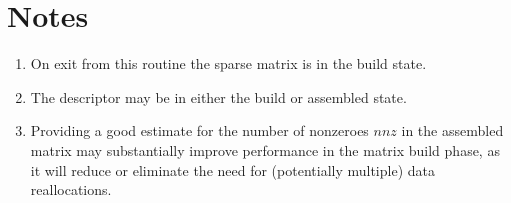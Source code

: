 \section*{Notes}
\begin{enumerate}
\item On exit from this routine the sparse matrix  is in the build
  state.
\item The descriptor may be in either the build or assembled state.
\item Providing a good estimate for the number of nonzeroes $nnz$ in
  the assembled matrix may substantially improve performance in the
  matrix build phase, as it will reduce or eliminate the need for
  (potentially multiple) data reallocations. 
\end{enumerate}



%
%


